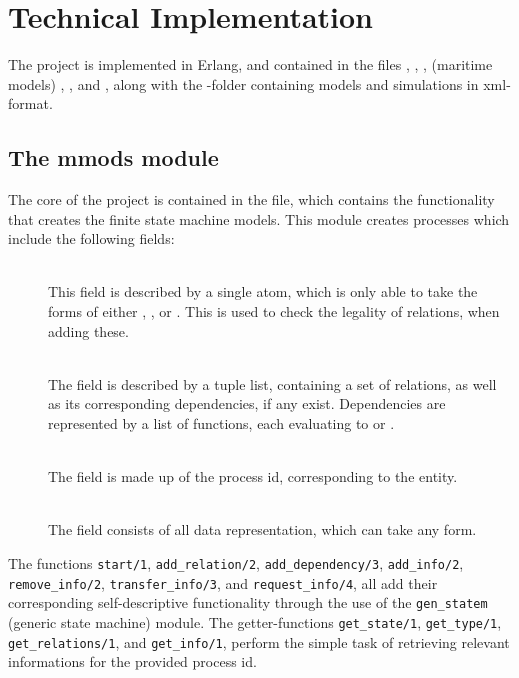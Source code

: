 \section{Technical Implementation}
The project is implemented in Erlang, and contained in the files , , , (maritime models) , , and , along with the -folder containing models and simulations in xml-format.

\subsection{The mmods module}
The core of the project is contained in the  file, which contains the functionality that creates the finite state machine models. This module creates processes which include the following fields:
\begin{description}
	\item[]\ \\
		This field is described by a single atom, which is only able to take the forms of either , , or . This is used to check the legality of relations, when adding these.
	\item[]\ \\
		The  field is described by a tuple list, containing a set of relations, as well as its corresponding dependencies, if any exist. Dependencies are represented by a list of functions, each evaluating to  or .
	\item[]\ \\
		The  field is made up of the process id, corresponding to the entity.
	\item[]\ \\
		The  field consists of all data representation, which can take any form.
\end{description}
The functions \lstinline{start/1}, \lstinline{add_relation/2}, \lstinline{add_dependency/3}, \lstinline{add_info/2}, \linebreak \lstinline{remove_info/2}, \lstinline{transfer_info/3}, and \lstinline{request_info/4}, all add their corresponding self-descriptive functionality through the use of the \lstinline{gen_statem} (generic state machine) module. The getter-functions \lstinline{get_state/1}, \lstinline{get_type/1}, \lstinline{get_relations/1}, and \lstinline{get_info/1}, perform the simple task of retrieving relevant informations for the provided process id.

